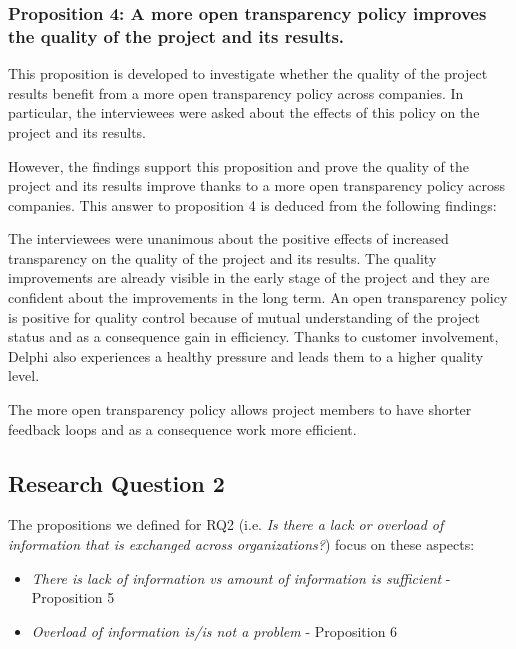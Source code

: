 \subsubsection{Proposition 4: A more open transparency policy improves the quality of the project and its results.}

This proposition is developed to investigate whether the quality of the project results benefit from a more open transparency policy across companies. In particular, the interviewees were asked about the effects of this policy on the project and its results.

However, the findings support this proposition and prove the quality of the project and its results improve thanks to a more open transparency policy across companies. This answer to proposition 4 is deduced from the following findings:

 The interviewees were unanimous about the positive effects of increased transparency on the quality of the project and its results. The quality improvements are already visible in the early stage of the project and they are confident about the improvements in the long term. An open transparency policy is positive for quality control because of mutual understanding of the project status and as a consequence gain in efficiency. Thanks to customer involvement, Delphi also experiences a healthy pressure and leads them to a higher quality level.

 The more open transparency policy allows project members to have shorter feedback loops and as a consequence work more efficient.

\subsection{Research Question 2}\label{sec:ResearchQuestion2}

The propositions we defined for  
RQ2 (i.e. {\em Is there a lack or overload of information that is exchanged across organizations?}) focus on these aspects:

\begin{itemize}
\item {\em There is lack of information vs amount of information is sufficient} - Proposition 5 %
\item {\em Overload of information is/is not a problem} - Proposition 6
\end{itemize}

